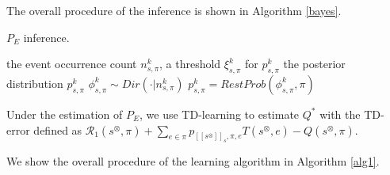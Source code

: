 \documentclass[10 pt, dvipdfmx]{article}
\theoremstyle{definition}
\newcommand{\mysps}{\ensuremath{[\![s^{\otimes}]\!]}_s}
\begin{document}
The overall procedure of the inference is shown in Algorithm \ref{bayes}.

\begin{algorithm}[H]
 \caption{$P_E$ inference.}
 \begin{algorithmic}[1]
 \renewcommand{\algorithmicrequire}{\textbf{Input:}}
 \renewcommand{\algorithmicensure}{\textbf{Output:}}
 \REQUIRE the event occurrence count $n^k_{s,\pi}$, a threshold $\xi^k_{s,\pi}$ for $p^k_{s,\pi}$
 \ENSURE  the posterior distribution $p^k_{s,\pi}$
  \STATE $\phi^k_{s,\pi} \sim Dir(\cdot|n^k_{s,\pi})$
  \STATE $p^k_{s,\pi} = RestProb(\phi^k_{s,\pi},\pi)$
 \end{algorithmic}
 \label{bayes}
 \end{algorithm}

Under the estimation of $P_E$, we use TD-learning to estimate $Q^{\ast}$ with the TD-error defined as $\mathcal{R}_1(s^{\otimes},\pi) + \sum_{e \in \pi} p_{\mysps,\pi,e} T(s^{\otimes},e) - Q(s^{\otimes},\pi)$.

We show the overall procedure of the learning algorithm in Algorithm \ref{alg1}.
\end{document}
